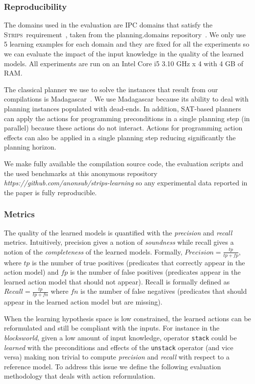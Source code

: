 \documentclass{article}
\newcommand{\strips}{\textsc{Strips}}     %
\begin{document}
\subsubsection{Reproducibility}
The domains used in the evaluation are IPC domains that satisfy the \strips\ requirement~\cite{fox2003pddl2}, taken from the {\sc planning.domains} repository~\cite{muise2016planning}. We only use 5 learning examples for each domain and they are fixed for all the experiments so we can evaluate the impact of the input knowledge in the quality of the learned models. All experiments are run on an Intel Core i5 3.10 GHz x 4 with 4 GB of RAM.

The classical planner we use to solve the instances that result from our compilations is {\sc Madagascar}~\cite{rintanen2014madagascar}. We use {\sc Madagascar} because its ability to deal with planning instances populated with dead-ends. In addition, SAT-based planners can apply the actions for programming preconditions in a single planning step (in parallel) because these actions do not interact. Actions for programming action effects can also be applied in a single planning step reducing significantly the planning horizon.

We make fully available the compilation source code, the evaluation scripts and the used benchmarks at this anonymous repository {\em https://github.com/anonsub/strips-learning} so any experimental data reported in the paper is fully reproducible. 

\subsubsection{Metrics}
The quality of the learned models is quantified with the {\em precision} and {\em recall} metrics. Intuitively, precision gives a notion of {\em soundness} while recall gives a notion of the {\em completeness} of the learned models. Formally, $Precision=\frac{tp}{tp+fp}$, where $tp$ is the number of true positives (predicates that correctly appear in the action model) and $fp$ is the number of false positives (predicates appear in the learned action model that should not appear). Recall is formally defined as $Recall=\frac{tp}{tp+fn}$ where $fn$ is the number of false negatives (predicates that should appear in the learned action model but are missing).

When the learning hypothesis space is low constrained, the learned actions can be reformulated and still be compliant with the inputs. For instance in the {\em blocksworld}, given a low amount of input knowledge, operator {\small\tt stack} could be {\em learned} with the preconditions and effects of the {\small\tt unstack} operator (and vice versa) making non trivial to compute {\em precision} and {\em recall} with respect to a reference model. To address this issue we define the following evaluation methodology that deals with action reformulation.
\end{document}
